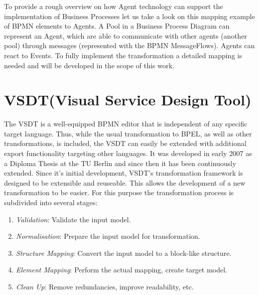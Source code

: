 To provide a rough overview on how Agent technology can support the implementation of Business Processes let us take a look on this mapping example of BPMN elements to Agents. A Pool in a Business Process Diagram can represent an Agent, which are able to communicate with other agents (another pool) through messages (represented with the BPMN MessageFlows). Agents can react to Events. To fully implement the transformation a detailed mapping is needed and will be developed in the scope of this work. 

\section{VSDT(Visual Service Design Tool)}
The VSDT \cite{5,2,3,1} is a well-equipped BPMN editor that is independent of any specific target language. Thus, while the usual transformation to BPEL, as well as other transformations, is included, the VSDT can easily be extended with additional export functionality targeting other languages. It was developed in early 2007 as a Diploma Thesis at the TU Berlin and since then it has been continuously extended. Since it's initial development, VSDT's transformation framework is designed to be extensible and reuseable. This allows the development of a new transformation to be easier. For this purpose the transformation process is subdivided into several stages: 
\begin{enumerate}
	\item \textit{Validation}: Validate the input model.
	\item \textit{Normalisation}: Prepare the input model for transformation.
	\item \textit{Structure Mapping}: Convert the input model to a block-like structure.
	\item \textit{Element Mapping}: Perform the actual mapping, create target model.
	\item \textit{Clean Up}: Remove redundancies, improve readability, etc.
\end{enumerate}

